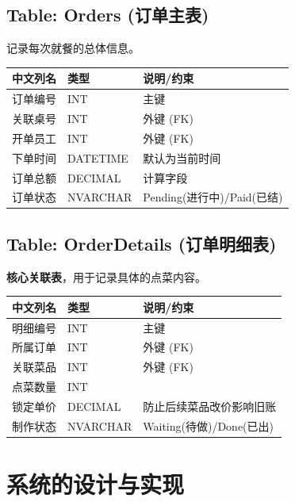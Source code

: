 \documentclass[11pt, a4paper]{article}
\begin{document}
\subsection{Table: Orders (订单主表)}
记录每次就餐的总体信息。
\begin{table}[H] %
    \centering
    \begin{tabular}{p{} p{} p{}}
        \toprule
        \textbf{中文列名} & \textbf{类型} & \textbf{说明/约束} \\
        \midrule
        订单编号 & INT & 主键 \\
        关联桌号 & INT & 外键 (FK) \\
        开单员工 & INT & 外键 (FK) \\
        下单时间 & DATETIME & 默认为当前时间 \\
        订单总额 & DECIMAL & 计算字段 \\
        订单状态 & NVARCHAR & Pending(进行中)/Paid(已结) \\
        \bottomrule
    \end{tabular}
\end{table}

\subsection{Table: OrderDetails (订单明细表)}
\textbf{核心关联表}，用于记录具体的点菜内容。
\begin{table}[H] %
    \centering
    \begin{tabular}{p{} p{} p{}}
        \toprule
        \textbf{中文列名} & \textbf{类型} & \textbf{说明/约束} \\
        \midrule
        明细编号 & INT & 主键 \\
        所属订单 & INT & 外键 (FK) \\
        关联菜品 & INT & 外键 (FK) \\
        点菜数量 & INT &  \\
        锁定单价 & DECIMAL & 防止后续菜品改价影响旧账 \\
        制作状态 & NVARCHAR & Waiting(待做)/Done(已出) \\
        \bottomrule
    \end{tabular}
\end{table}


\section{系统的设计与实现}
\end{document}
